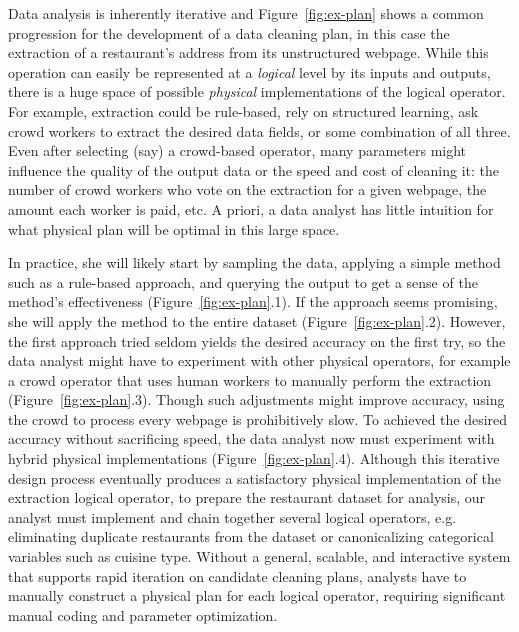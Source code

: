 Data analysis is inherently iterative and Figure~\ref{fig:ex-plan} shows a common progression for the development of a data cleaning plan, in this case the extraction of a restaurant's address from its unstructured webpage.
While this operation can easily be represented at a \textit{logical} level by its inputs and outputs, there is a huge space of possible \textit{physical} implementations of the logical operator. 
For example, extraction could be rule-based, rely on structured learning, ask crowd workers to extract the desired data fields, or some combination of all three.
Even after selecting (say) a crowd-based operator, many parameters might influence the quality of the output data or the speed and cost of cleaning it: the number of crowd workers who vote on the extraction for a given webpage, the amount each worker is paid, etc.
A priori, a data analyst has little intuition for what physical plan will be optimal in this large space.

In practice, she will likely start by sampling the data, applying a simple method such as a rule-based approach, and querying the output to get a sense of the method's effectiveness (Figure~\ref{fig:ex-plan}.1).
If the approach seems promising, she will apply the method to the entire dataset (Figure~\ref{fig:ex-plan}.2).
However, the first approach tried seldom yields the desired accuracy on the first try, so the data analyst might have to experiment with other physical operators, for example a crowd operator that uses human workers to manually perform the extraction (Figure~\ref{fig:ex-plan}.3).
Though such adjustments might improve accuracy, using the crowd to process every webpage is prohibitively slow.
To achieved the desired accuracy without sacrificing speed, the data analyst now must experiment with hybrid physical implementations (Figure~\ref{fig:ex-plan}.4).
Although this iterative design process eventually produces a satisfactory physical implementation of the extraction logical operator, to prepare the restaurant dataset for analysis, our analyst must implement and chain together several logical operators, e.g. eliminating duplicate restaurants from the dataset or canonicalizing categorical variables such as cuisine type.
Without a general, scalable, and interactive system that supports rapid iteration on candidate cleaning plans, analysts have to manually construct a physical plan for each logical operator, requiring significant manual coding and parameter optimization.



